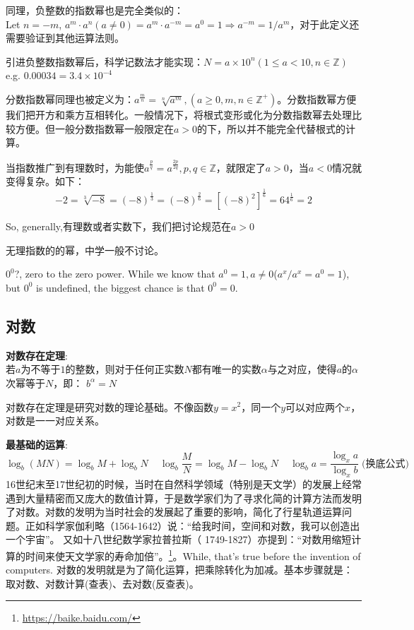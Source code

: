 \documentclass[../main.tex]{subfiles}
\begin{document}
同理，负整数的指数幂也是完全类似的：\\
Let $n=-m$, $a^m\cdot a^n(a\neq 0)=a^m\cdot a^{-m}=a^0=1 \Rightarrow a^{-m}=1/a^m$，对于此定义还需要验证到其他运算法则。

引进负整数指数幂后，科学记数法才能实现：$N=a\times 10^n(1\leq a <10, n\in \mathbb{Z} )$\\
e.g. $0.00034=3.4\times 10^{-4}$

分数指数幂同理也被定义为：$a^{\frac{m}{n}}=\sqrt[n]{a^m},(a\geq 0, m,n\in \mathbb{Z^+})$。分数指数幂方便我们把开方和乘方互相转化。一般情况下，将根式变形或化为分数指数幂去处理比较方便。但一般分数指数幂一般限定在$a>0$的下，所以并不能完全代替根式的计算。

当指数推广到有理数时，为能使$a^{\frac{p}{q}}=a^{\frac{2p}{2q}}, p,q \in \mathbb{Z}$，就限定了$a>0$，当$a<0$情况就变得复杂。如下：
\[
  -2=\sqrt[3]{-8}=(-8)^{\frac{1}{3}}=(-8)^{\frac{2}{6}}=[(-8)^2]^{\frac{1}{6}}=64^{\frac{1}{6}}=2
\]

So, generally,有理数或者实数下，我们把讨论规范在$a>0$

无理指数的的幂，中学一般不讨论。

$0^0$?, zero to the zero power. While we know that $a^0=1, a\ne 0$($a^x/a^x=a^0=1$), but $0^0$ is undefined, the biggest chance is that $0^0=0$.

\subsection{对数}

\begin{mdframed}
  \textbf{对数存在定理}:\\
  若$a$为不等于$1$的整数，则对于任何正实数$N$都有唯一的实数$\alpha$与之对应，使得$a$的$\alpha$次幂等于$N$，即：  $b^{\alpha}=N$
\end{mdframed}
对数存在定理是研究对数的理论基础。不像函数$y=x^2$，同一个$y$可以对应两个$x$，对数是一一对应关系。

\textbf{最基础的运算}:
\[ \log_b(MN)=\log_bM+\log_bN \phantom{xx}\log_b \frac{M}{N} = \log_bM - \log_bN \phantom{xx} \log_ba = \frac{\log_{x}a}{\log_{x}b}\;\text{(换底公式)} \]
16世纪末至17世纪初的时候，当时在自然科学领域（特别是天文学）的发展上经常遇到大量精密而又庞大的数值计算，于是数学家们为了寻求化简的计算方法而发明了对数。对数的发明为当时社会的发展起了重要的影响，简化了行星轨道运算问题。正如科学家伽利略（1564-1642）说：“给我时间，空间和对数，我可以创造出一个宇宙”。 又如十八世纪数学家拉普拉斯（ 1749-1827）亦提到：“对数用缩短计算的时间来使天文学家的寿命加倍”。\footnote{\url{https://baike.baidu.com/}}。While, that's true before the invention of computers. 对数的发明就是为了简化运算，把乘除转化为加减。基本步骤就是：取对数、对数计算(查表)、去对数(反查表)。
\end{document}
